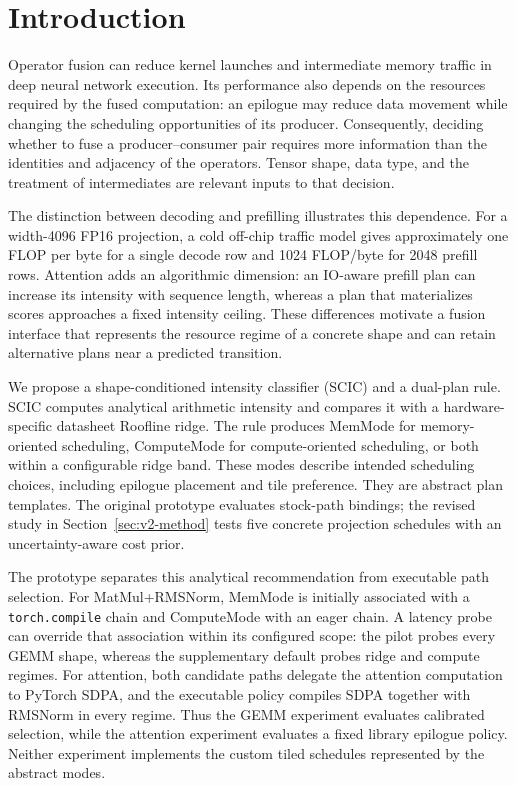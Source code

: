 \documentclass[a4paper,fleqn]{cas-dc}
\begin{document}
\maketitle
\section{Introduction}
\label{sec:intro}

Operator fusion can reduce kernel launches and intermediate memory traffic in deep neural network execution.
Its performance also depends on the resources required by the fused computation: an epilogue may reduce data movement while changing the scheduling opportunities of its producer.
Consequently, deciding whether to fuse a producer--consumer pair requires more information than the identities and adjacency of the operators.
Tensor shape, data type, and the treatment of intermediates are relevant inputs to that decision.

The distinction between decoding and prefilling illustrates this dependence.
For a width-4096 FP16 projection, a cold off-chip traffic model gives approximately one FLOP per byte for a single decode row and 1024 FLOP/byte for 2048 prefill rows.
Attention adds an algorithmic dimension: an IO-aware prefill plan can increase its intensity with sequence length, whereas a plan that materializes scores approaches a fixed intensity ceiling.
These differences motivate a fusion interface that represents the resource regime of a concrete shape and can retain alternative plans near a predicted transition.

We propose a shape-conditioned intensity classifier (SCIC) and a dual-plan rule.
SCIC computes analytical arithmetic intensity and compares it with a hardware-specific datasheet Roofline ridge.
The rule produces MemMode for memory-oriented scheduling, ComputeMode for compute-oriented scheduling, or both within a configurable ridge band.
These modes describe intended scheduling choices, including epilogue placement and tile preference.
They are abstract plan templates. The original prototype evaluates stock-path bindings; the revised study in Section~\ref{sec:v2-method} tests five concrete projection schedules with an uncertainty-aware cost prior.

The prototype separates this analytical recommendation from executable path selection.
For MatMul+RMSNorm, MemMode is initially associated with a \texttt{torch.compile} chain and ComputeMode with an eager chain.
A latency probe can override that association within its configured scope: the pilot probes every GEMM shape, whereas the supplementary default probes ridge and compute regimes.
For attention, both candidate paths delegate the attention computation to PyTorch SDPA, and the executable policy compiles SDPA together with RMSNorm in every regime.
Thus the GEMM experiment evaluates calibrated selection, while the attention experiment evaluates a fixed library epilogue policy.
Neither experiment implements the custom tiled schedules represented by the abstract modes.
\end{document}
